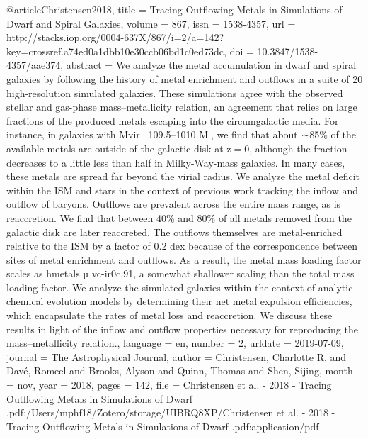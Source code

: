 {@article{Christensen2018,
	title = {Tracing {Outflowing} {Metals} in {Simulations} of {Dwarf} and {Spiral} {Galaxies}},
	volume = {867},
	issn = {1538-4357},
	url = {http://stacks.iop.org/0004-637X/867/i=2/a=142?key=crossref.a74ed0a1dbb10e30ccb06bd1c0ed73dc},
	doi = {10.3847/1538-4357/aae374},
	abstract = {We analyze the metal accumulation in dwarf and spiral galaxies by following the history of metal enrichment and outﬂows in a suite of 20 high-resolution simulated galaxies. These simulations agree with the observed stellar and gas-phase mass–metallicity relation, an agreement that relies on large fractions of the produced metals escaping into the circumgalactic media. For instance, in galaxies with Mvir∼109.5–1010 M, we ﬁnd that about ∼85\% of the available metals are outside of the galactic disk at z=0, although the fraction decreases to a little less than half in Milky-Way-mass galaxies. In many cases, these metals are spread far beyond the virial radius. We analyze the metal deﬁcit within the ISM and stars in the context of previous work tracking the inﬂow and outﬂow of baryons. Outﬂows are prevalent across the entire mass range, as is reaccretion. We ﬁnd that between 40\% and 80\% of all metals removed from the galactic disk are later reaccreted. The outﬂows themselves are metal-enriched relative to the ISM by a factor of 0.2 dex because of the correspondence between sites of metal enrichment and outﬂows. As a result, the metal mass loading factor scales as hmetals µ vc-ir0c.91, a somewhat shallower scaling than the total mass loading factor. We analyze the simulated galaxies within the context of analytic chemical evolution models by determining their net metal expulsion efﬁciencies, which encapsulate the rates of metal loss and reaccretion. We discuss these results in light of the inﬂow and outﬂow properties necessary for reproducing the mass–metallicity relation.},
	language = {en},
	number = {2},
	urldate = {2019-07-09},
	journal = {The Astrophysical Journal},
	author = {Christensen, Charlotte R. and Davé, Romeel and Brooks, Alyson and Quinn, Thomas and Shen, Sijing},
	month = nov,
	year = {2018},
	pages = {142},
	file = {Christensen et al. - 2018 - Tracing Outflowing Metals in Simulations of Dwarf .pdf:/Users/mphf18/Zotero/storage/UIBRQ8XP/Christensen et al. - 2018 - Tracing Outflowing Metals in Simulations of Dwarf .pdf:application/pdf}
}


}
